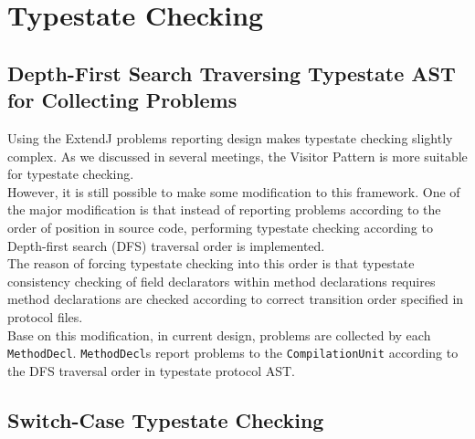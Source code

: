 \documentclass[]{article}
\begin{document}
\section{Typestate Checking}

\subsection{Depth-First Search Traversing Typestate AST for Collecting Problems}
Using the ExtendJ problems reporting design makes typestate checking slightly complex. As we discussed in several meetings, the Visitor Pattern is more suitable for typestate checking. \\[0.2cm]
However, it is still possible to make some modification to this framework. One of the major modification is that instead of reporting problems according to the order of position in source code, performing typestate checking according to Depth-first search (DFS) traversal order is implemented. \\[0.2cm]
The reason of forcing typestate checking into this order is that typestate consistency checking of field declarators within method declarations requires method declarations are checked according to correct transition order specified in protocol files. \\[0.2cm]
Base on this modification, in current design, problems are collected by each \texttt{MethodDecl}. \texttt{MethodDecl}s report problems to the \texttt{CompilationUnit} according to the DFS traversal order in typestate protocol AST. 

\subsection{Switch-Case Typestate Checking}





\end{document}
